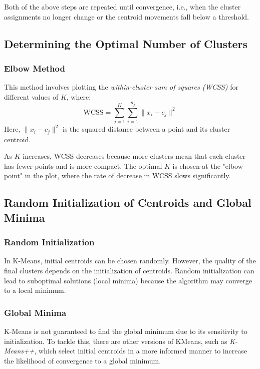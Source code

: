 \documentclass{article}
\begin{document}
\vspace{10pt}
\hspace{-15pt}Both of the above steps are repeated until convergence, i.e., when the cluster assignments no longer change or the centroid movements fall below a threshold.

\subsection*{Determining the Optimal Number of Clusters}

\subsubsection*{Elbow Method}
This method involves plotting the \textit{within-cluster sum of squares (WCSS)} for different values of $K$, where:
\[
\text{WCSS} = \sum_{j=1}^{K} \sum_{i=1}^{n_j} \|x_i - c_j\|^2
\]
Here, $\|x_i - c_j\|^2$ is the squared distance between a point and its cluster centroid.

\vspace{10pt}
\hspace{-15pt}As $K$ increases, WCSS decreases because more clusters mean that each cluster has fewer points and is more compact. The optimal $K$ is chosen at the "elbow point" in the plot, where the rate of decrease in WCSS slows significantly.

\subsection*{Random Initialization of Centroids and Global Minima}

\subsubsection*{Random Initialization}
In K-Means, initial centroids can be chosen randomly. However, the quality of the final clusters depends on the initialization of centroids. Random initialization can lead to suboptimal solutions (local minima) because the algorithm may converge to a local minimum.

\subsubsection*{Global Minima}
K-Means is not guaranteed to find the global minimum due to its sensitivity to initialization. To tackle this, there are other versions of KMeans, such as \textit{K-Means++}, which select initial centroids in a more informed manner to increase the likelihood of convergence to a global minimum.
\end{document}
